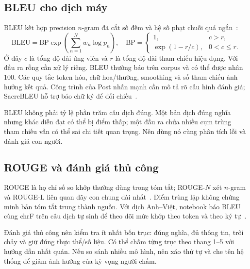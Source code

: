 \documentclass[11pt,a4paper]{article}
\numberwithin{equation}{section}
\begin{document}
\subsection{BLEU cho dịch máy}
BLEU kết hợp precision $n$-gram đã cắt số đếm và hệ số phạt chuỗi quá ngắn~\cite{bleu}:
\begin{equation}
\mathrm{BLEU}=\mathrm{BP}\exp\left(\sum_{n=1}^{N}w_n\log p_n\right),
\quad
\mathrm{BP}=\begin{cases}1,&c>r,\\\exp(1-r/c),&0<c\leq r.\end{cases}
\end{equation}
Ở đây $c$ là tổng độ dài ứng viên và $r$ là tổng độ dài tham chiếu hiệu dụng. Với đầu ra rỗng cần xử lý riêng. BLEU thường báo trên corpus và có thể được nhân 100. Các quy tắc token hóa, chữ hoa/thường, smoothing và số tham chiếu ảnh hưởng kết quả. Công trình của Post nhấn mạnh cần mô tả rõ cấu hình đánh giá; SacreBLEU hỗ trợ báo chữ ký để đối chiếu~\cite{sacrebleu}.

BLEU không phải tỷ lệ phần trăm câu dịch đúng. Một bản dịch đúng nghĩa nhưng khác diễn đạt có thể bị điểm thấp; một đầu ra chứa nhiều cụm trùng tham chiếu vẫn có thể sai chi tiết quan trọng. Nên dùng nó cùng phân tích lỗi và đánh giá con người.

\subsection{ROUGE và đánh giá thủ công}
ROUGE là họ chỉ số so khớp thường dùng trong tóm tắt; ROUGE-$N$ xét $n$-gram và ROUGE-L liên quan dãy con chung dài nhất~\cite{rouge}. Điểm trùng lặp không chứng minh bản tóm tắt trung thành nguồn. Với dịch Anh--Việt, notebook báo BLEU cùng chrF trên câu dịch tự sinh để theo dõi mức khớp theo token và theo ký tự~\cite{chrf}.

Đánh giá thủ công nên kiểm tra ít nhất bốn trục: đúng nghĩa, đủ thông tin, trôi chảy và giữ đúng thực thể/số liệu. Có thể chấm từng trục theo thang 1--5 với hướng dẫn nhất quán. Nếu so sánh nhiều mô hình, nên xáo thứ tự và che tên hệ thống để giảm ảnh hưởng của kỳ vọng người chấm.
\end{document}

